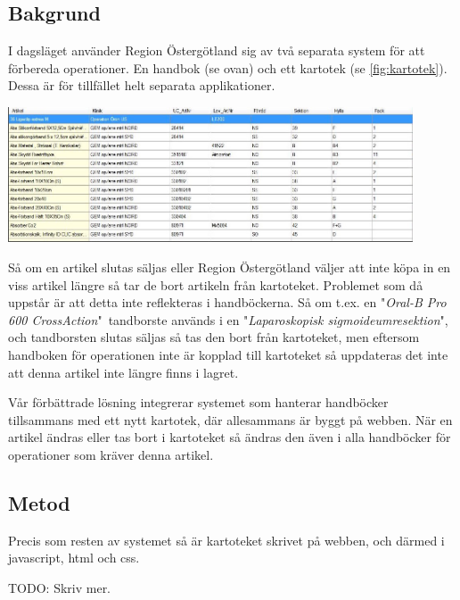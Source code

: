 \clearpage
\subsection{Bakgrund}
I dagsläget använder Region Östergötland sig av två separata system
för att förbereda operationer. En handbok (se ovan) och ett kartotek (se \ref{fig:kartotek}).
Dessa är för tillfället helt separata applikationer.

\begin{center}
  \includegraphics[width=0.9\textwidth]{../images/forradsinfo.jpg}
  \label{fig:kartotek}
\end{center}

Så om en artikel slutas säljas eller Region Östergötland
väljer att inte köpa in en viss artikel längre så tar de bort artikeln
från kartoteket. Problemet som då uppstår är att detta inte reflekteras
i handböckerna. Så om t.ex. en "\textit{Oral-B Pro 600 CrossAction}"\ tandborste används i
en "\textit{Laparoskopisk sigmoideumresektion}", och tandborsten slutas säljas
så tas den bort från kartoteket, men eftersom handboken för operationen inte är
kopplad till kartoteket så uppdateras det inte att denna artikel inte längre finns i lagret.

Vår förbättrade lösning
integrerar systemet som hanterar handböcker tillsammans med ett nytt kartotek,
där allesammans är byggt på webben. När en artikel ändras eller tas bort i kartoteket
så ändras den även i alla handböcker för operationer som kräver denna artikel.



\subsection{Metod}
Precis som resten av systemet så är kartoteket skrivet på webben, och
därmed i javascript, html och css.

TODO: Skriv mer.

